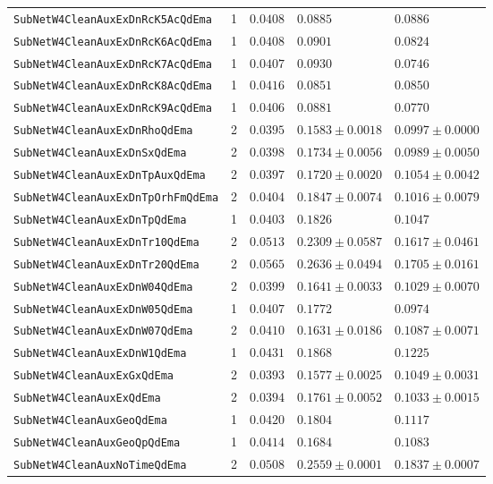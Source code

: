 \begin{longtable}{lrlll}
\texttt{SubNetW4CleanAuxExDnRcK5AcQdEma} & 1 & $0.0408$ & $0.0885$ & $0.0886$\\
\texttt{SubNetW4CleanAuxExDnRcK6AcQdEma} & 1 & $0.0408$ & $0.0901$ & $0.0824$\\
\texttt{SubNetW4CleanAuxExDnRcK7AcQdEma} & 1 & $0.0407$ & $0.0930$ & $0.0746$\\
\texttt{SubNetW4CleanAuxExDnRcK8AcQdEma} & 1 & $0.0416$ & $0.0851$ & $0.0850$\\
\texttt{SubNetW4CleanAuxExDnRcK9AcQdEma} & 1 & $0.0406$ & $0.0881$ & $0.0770$\\
\texttt{SubNetW4CleanAuxExDnRhoQdEma} & 2 & $0.0395$ & $0.1583\pm0.0018$ & $0.0997\pm0.0000$\\
\texttt{SubNetW4CleanAuxExDnSxQdEma} & 2 & $0.0398$ & $0.1734\pm0.0056$ & $0.0989\pm0.0050$\\
\texttt{SubNetW4CleanAuxExDnTpAuxQdEma} & 2 & $0.0397$ & $0.1720\pm0.0020$ & $0.1054\pm0.0042$\\
\texttt{SubNetW4CleanAuxExDnTpOrhFmQdEma} & 2 & $0.0404$ & $0.1847\pm0.0074$ & $0.1016\pm0.0079$\\
\texttt{SubNetW4CleanAuxExDnTpQdEma} & 1 & $0.0403$ & $0.1826$ & $0.1047$\\
\texttt{SubNetW4CleanAuxExDnTr10QdEma} & 2 & $0.0513$ & $0.2309\pm0.0587$ & $0.1617\pm0.0461$\\
\texttt{SubNetW4CleanAuxExDnTr20QdEma} & 2 & $0.0565$ & $0.2636\pm0.0494$ & $0.1705\pm0.0161$\\
\texttt{SubNetW4CleanAuxExDnW04QdEma} & 2 & $0.0399$ & $0.1641\pm0.0033$ & $0.1029\pm0.0070$\\
\texttt{SubNetW4CleanAuxExDnW05QdEma} & 1 & $0.0407$ & $0.1772$ & $0.0974$\\
\texttt{SubNetW4CleanAuxExDnW07QdEma} & 2 & $0.0410$ & $0.1631\pm0.0186$ & $0.1087\pm0.0071$\\
\texttt{SubNetW4CleanAuxExDnW1QdEma} & 1 & $0.0431$ & $0.1868$ & $0.1225$\\
\texttt{SubNetW4CleanAuxExGxQdEma} & 2 & $0.0393$ & $0.1577\pm0.0025$ & $0.1049\pm0.0031$\\
\texttt{SubNetW4CleanAuxExQdEma} & 2 & $0.0394$ & $0.1761\pm0.0052$ & $0.1033\pm0.0015$\\
\texttt{SubNetW4CleanAuxGeoQdEma} & 1 & $0.0420$ & $0.1804$ & $0.1117$\\
\texttt{SubNetW4CleanAuxGeoQpQdEma} & 1 & $0.0414$ & $0.1684$ & $0.1083$\\
\texttt{SubNetW4CleanAuxNoTimeQdEma} & 2 & $0.0508$ & $0.2559\pm0.0001$ & $0.1837\pm0.0007$\\

\end{longtable}
